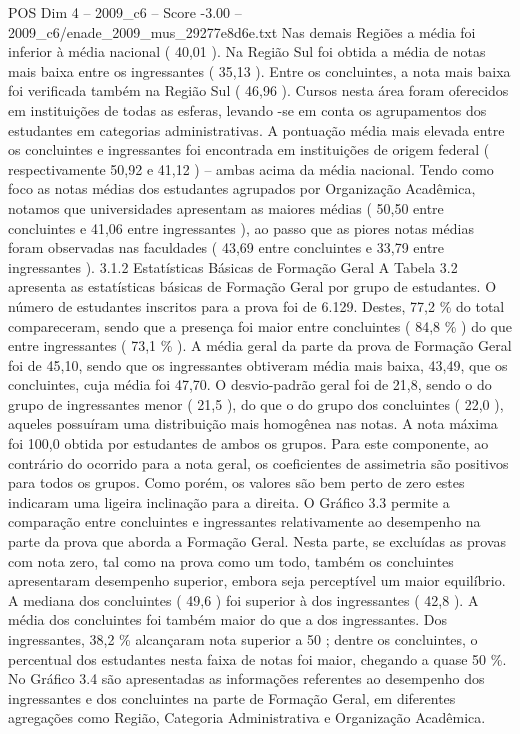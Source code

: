 \begin{textsample}{POS Dim 4 – 2009\_c6 – Score -3.00 – 2009\_c6/enade\_2009\_mus\_29277e8d6e.txt}
Nas demais Regiões a média foi inferior à média nacional ( 40,01 ).
Na Região Sul foi obtida a média de notas mais baixa entre os ingressantes ( 35,13 ).
Entre os concluintes, a nota mais baixa foi verificada também na Região Sul ( 46,96 ).
Cursos nesta área foram oferecidos em instituições de todas as esferas, levando -se em conta os agrupamentos dos estudantes em categorias administrativas.
A pontuação média mais elevada entre os concluintes e ingressantes foi encontrada em instituições de origem federal ( respectivamente 50,92 e 41,12 ) – ambas acima da média nacional.
Tendo como foco as notas médias dos estudantes agrupados por Organização Acadêmica, notamos que universidades apresentam as maiores médias ( 50,50 entre concluintes e 41,06 entre ingressantes ), ao passo que as piores notas médias foram observadas nas faculdades ( 43,69 entre concluintes e 33,79 entre ingressantes ). 3.1.2 Estatísticas Básicas de Formação Geral A Tabela 3.2 apresenta as estatísticas básicas de Formação Geral por grupo de estudantes.
O número de estudantes inscritos para a prova foi de 6.129.
Destes, 77,2 \% do total compareceram, sendo que a presença foi maior entre concluintes ( 84,8 \% ) do que entre ingressantes ( 73,1 \% ).
A média geral da parte da prova de Formação Geral foi de 45,10, sendo que os ingressantes obtiveram média mais baixa, 43,49, que os concluintes, cuja média foi 47,70.
O desvio-padrão geral foi de 21,8, sendo o do grupo de ingressantes menor ( 21,5 ), do que o do grupo dos concluintes ( 22,0 ), aqueles possuíram uma distribuição mais homogênea nas notas.
A nota máxima foi 100,0 obtida por estudantes de ambos os grupos.
Para este componente, ao contrário do ocorrido para a nota geral, os coeficientes de assimetria são positivos para todos os grupos.
Como porém, os valores são bem perto de zero estes indicaram uma ligeira inclinação para a direita.
O Gráfico 3.3 permite a comparação entre concluintes e ingressantes relativamente ao desempenho na parte da prova que aborda a Formação Geral.
Nesta parte, se excluídas as provas com nota zero, tal como na prova como um todo, também os concluintes apresentaram desempenho superior, embora seja perceptível um maior equilíbrio.
A mediana dos concluintes ( 49,6 ) foi superior à dos ingressantes ( 42,8 ).
A média dos concluintes foi também maior do que a dos ingressantes.
Dos ingressantes, 38,2 \% alcançaram nota superior a 50 ; dentre os concluintes, o percentual dos estudantes nesta faixa de notas foi maior, chegando a quase 50 \%.
No Gráfico 3.4 são apresentadas as informações referentes ao desempenho dos ingressantes e dos concluintes na parte de Formação Geral, em diferentes agregações como Região, Categoria Administrativa e Organização Acadêmica.

\end{textsample}
